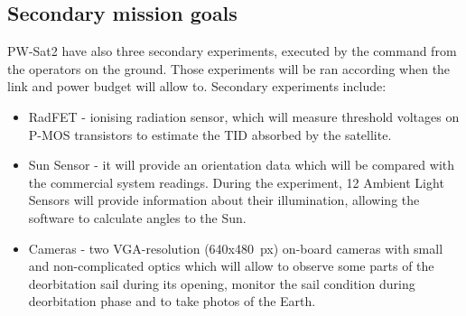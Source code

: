 \subsection{Secondary mission goals}
PW-Sat2 have also three secondary experiments, executed by the command from the operators on the ground. Those experiments will be ran according when the link and power budget will allow to. Secondary experiments include:
\begin{itemize}
    \item RadFET - ionising radiation sensor, which will measure threshold voltages on P-MOS transistors to estimate the TID absorbed by the satellite.
    \item Sun Sensor -  it will provide an orientation data which will be compared with the commercial system readings. During the experiment, \si{12} Ambient Light Sensors will provide information about their illumination, allowing the software to calculate angles to the Sun.
    \item Cameras - two VGA-resolution (\si{640}x\si{480}~px) on-board cameras with small and non-complicated optics which will allow to observe some parts of the deorbitation sail during its opening, monitor the sail condition during deorbitation phase and to take photos of the Earth.
\end{itemize}


